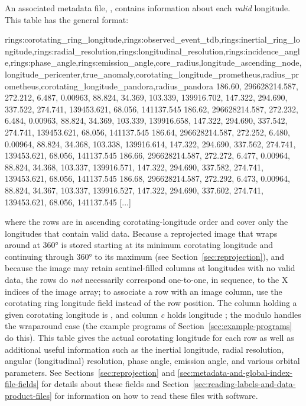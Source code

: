 An associated metadata file, , contains information about each \textit{valid} longitude. This table has the general format:

\begin{CodeBlock}[fontsize=\scriptsize]
rings:corotating_ring_longitude,rings:observed_event_tdb,rings:inertial_ring_longitude,rings:radial_resolution,rings:longitudinal_resolution,rings:incidence_angle,rings:phase_angle,rings:emission_angle,core_radius,longitude_ascending_node,longitude_pericenter,true_anomaly,corotating_longitude_prometheus,radius_prometheus,corotating_longitude_pandora,radius_pandora
186.60, 296628214.587, 272.212,    6.487,  0.00963,  88.824,  34.369, 103.339, 139916.702, 147.322, 294.690, 337.522, 274.741, 139453.621,  68.056, 141137.545
186.62, 296628214.587, 272.232,    6.484,  0.00963,  88.824,  34.369, 103.339, 139916.658, 147.322, 294.690, 337.542, 274.741, 139453.621,  68.056, 141137.545
186.64, 296628214.587, 272.252,    6.480,  0.00964,  88.824,  34.368, 103.338, 139916.614, 147.322, 294.690, 337.562, 274.741, 139453.621,  68.056, 141137.545
186.66, 296628214.587, 272.272,    6.477,  0.00964,  88.824,  34.368, 103.337, 139916.571, 147.322, 294.690, 337.582, 274.741, 139453.621,  68.056, 141137.545
186.68, 296628214.587, 272.292,    6.473,  0.00964,  88.824,  34.367, 103.337, 139916.527, 147.322, 294.690, 337.602, 274.741, 139453.621,  68.056, 141137.545
[...]
\end{CodeBlock}

\noindent where the rows are in ascending corotating-longitude order and cover only the longitudes that contain valid data. Because a reprojected image that wraps around at 360° is stored starting at its minimum corotating longitude and continuing through 360° to its maximum (see Section~\ref{sec:reprojection}), and because the image may retain sentinel-filled columns at longitudes with no valid data, the rows do \textit{not} necessarily correspond one-to-one, in sequence, to the X indices of the image array; to associate a row with an image column, use the corotating ring longitude field instead of the row position. The column holding a given corotating longitude is , and column \textit{c} holds longitude ; the modulo handles the wraparound case (the example programs of Section~\ref{sec:example-programs} do this). This table gives the actual corotating longitude for each row as well as additional useful information such as the inertial longitude, radial resolution, angular (longitudinal) resolution, phase angle, emission angle, and various orbital parameters. See Sections~\ref{sec:reprojection} and \ref{sec:metadata-and-global-index-file-fields} for details about these fields and Section~\ref{sec:reading-labels-and-data-product-files} for information on how to read these files with software.

